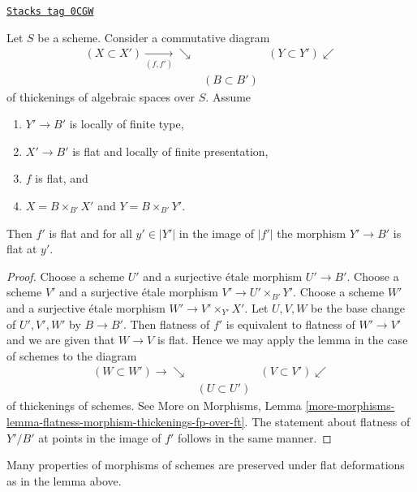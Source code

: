 \begin{lemma}
\label{spaces-more-morphisms-lemma-flatness-morphism-thickenings-fp-over-ft}
\href{https://stacks.math.columbia.edu/tag/0CGW}{\texttt{Stacks tag 0CGW}}

Let $S$ be a scheme. Consider a commutative diagram
$$
\begin{array}{ccc}(X \subset X') \underset{(f, f')}{\longrightarrow}\searrow &  & (Y \subset Y') \swarrow \\  & (B \subset B') & \end{array}
$$
of thickenings of algebraic spaces over $S$. Assume
\begin{enumerate}
\item $Y' \to B'$ is locally of finite type,
\item $X' \to B'$ is flat and locally of finite presentation,
\item $f$ is flat, and
\item $X = B \times_{B'} X'$ and $Y = B \times_{B'} Y'$.
\end{enumerate}
Then $f'$ is flat and for all $y' \in |Y'|$ in the image of $|f'|$
the morphism $Y' \to B'$ is flat at $y'$.
\end{lemma}

\begin{proof}
Choose a scheme $U'$ and a surjective \'etale morphism $U' \to B'$.
Choose a scheme $V'$ and a surjective \'etale morphism
$V' \to U' \times_{B'} Y'$.
Choose a scheme $W'$ and a surjective \'etale morphism
$W' \to V' \times_{Y'} X'$. Let $U, V, W$ be the base change
of $U', V', W'$ by $B \to B'$. Then flatness of $f'$ is
equivalent to flatness of $W' \to V'$ and we are
given that $W \to V$ is flat. Hence we may apply the lemma
in the case of schemes to the diagram
$$
\begin{array}{ccc}(W \subset W') \longrightarrow\searrow &  & (V \subset V') \swarrow \\  & (U \subset U') & \end{array}
$$
of thickenings of schemes. See
More on Morphisms, Lemma
\ref{more-morphisms-lemma-flatness-morphism-thickenings-fp-over-ft}.
The statement about flatness of $Y'/B'$ at points in the
image of $f'$ follows in the same manner.
\end{proof}

Many properties of morphisms of schemes are preserved under flat
deformations as in the lemma above.

